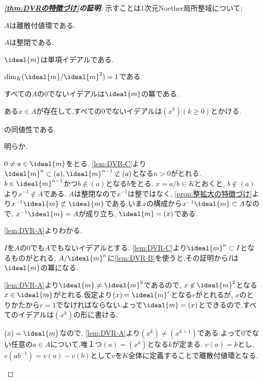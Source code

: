\begin{proof}[\textbf{\ref{thm:DVRの特徴づけ}の証明}]
	示すことは1次元Noether局所整域について;
	\begin{sakura}
		\item $A$は離散付値環である.
		\item $A$は整閉である.
		\item $\ideal{m}$は単項イデアルである.
		\item $\dim_K (\ideal{m}/\ideal{m}^2)=1$である.
		\item すべての$A$の0でないイデアルは$\ideal{m}$の冪である.
		\item ある$x\in A$が存在して,すべての0でないイデアルは$(x^k) (k\geq0)$とかける.
	\end{sakura}
	の同値性である.
	\begin{eqv}[6]
		\item 明らか.
		\item $0\neq a\in\ideal{m}$をとる. \ref{lem:DVR-C}より$\ideal{m}^n\subset(a),\ideal{m}^{n-1}\not\subset(a)$となる$n>0$がとれる. $b\in\ideal{m}^{n-1}$かつ$b\not\in(a)$となる$b$をとる. $x=a/b\in K$とおくと, $b\not\in(a)$より$x^{-1}\not\in A$である. $A$は整閉なので$x^{-1}$は整ではなく, \ref{prop:整拡大の特徴づけ}より$x^{-1}\ideal{m}\not\subset\ideal{m}$である.いま$x$の構成から$x^{-1}\ideal{m}\subset A$なので, $x^{-1}\ideal{m}=A$が成り立ち, $\ideal{m}=(x)$である.
		
		\item \ref{lem:DVR-A}よりわかる.
		
		\item $I$を$A$の$0$でも$A$でもないイデアルとする. \ref{lem:DVR-C}より$\ideal{m}^n\subset I$となるものがとれる. $A/\ideal{m}^n$に\ref{lem:DVR-B}を使うと,その証明から$I$は$\ideal{m}$の冪になる.
		
		\item \ref{lem:DVR-A}より$\ideal{m}\neq\ideal{m}^2$であるので, $x\not\in\ideal{m}^2$となる$x\in\ideal{m}$がとれる.仮定より$(x)=\ideal{m}^r$となる$r$がとれるが, $x$のとりかたから$r=1$でなければならない.よって$\ideal{m}=(x)$とできるので,すべてのイデアルは$(x^k)$の形に書ける.
		
		\item $(x)=\ideal{m}$なので, \ref{lem:DVR-A}より$(x^k)\neq(x^{k+1})$である.よって0でない任意の$a\in A$について,唯１つ$(a)=(x^k)$となる$k$が定まる. $v(a)=k$とし, $v(ab^{-1})=v(a)-v(b)$として$v$を$K$全体に定義することで離散付値環となる.
	\end{eqv}
\end{proof}

